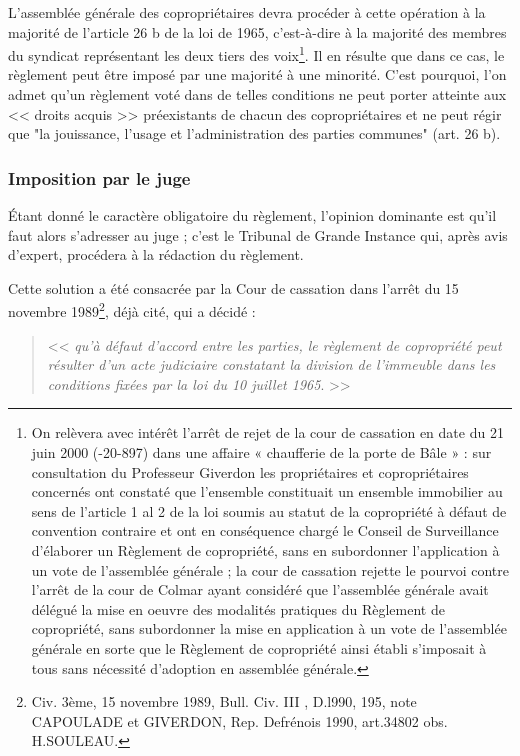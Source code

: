 			L'assemblée générale des copropriétaires devra procéder à cette opération à la majorité de l'article 26 b de la loi de 1965, c'est-à-dire à la majorité des membres du syndicat représentant les deux tiers des voix\footnote{On relèvera avec intérêt l’arrêt de rejet de la cour de cassation en date du 21 juin 2000 (-20-897) dans une affaire « chaufferie de la porte de Bâle » : sur consultation du Professeur Giverdon les propriétaires et copropriétaires concernés ont constaté que l’ensemble constituait un ensemble immobilier au sens de l’article 1 al 2 de la loi soumis au statut de la copropriété à défaut de convention contraire et ont en conséquence chargé le Conseil de Surveillance d’élaborer un Règlement de copropriété, sans en subordonner l’application à un vote de l'assemblée générale ; la cour de cassation rejette le pourvoi contre l’arrêt de la cour de Colmar ayant considéré que l'assemblée générale avait délégué la mise en oeuvre des modalités pratiques du Règlement de copropriété, sans subordonner la mise en application à un vote de l'assemblée générale en sorte que le Règlement de copropriété ainsi établi s’imposait à tous sans nécessité d’adoption en assemblée générale.}. Il en résulte que dans ce cas, le règlement peut être imposé par une majorité à une minorité. C'est pourquoi, l'on admet qu'un règlement voté dans de telles conditions ne peut porter atteinte aux << droits acquis >> préexistants de chacun des copropriétaires et ne peut régir que "la jouissance, l'usage et l'administration des parties communes" (art. 26 b).
		
		\subsubsection{Imposition par le juge}
		
			Étant donné le caractère obligatoire du règlement, l'opinion dominante est qu'il faut alors s'adresser au juge ; c'est le Tribunal de Grande Instance qui, après avis d'expert, procédera à la rédaction du règlement.
			
			Cette solution a été consacrée par la Cour de cassation dans l’arrêt du 15 novembre 1989\footnote{Civ. 3ème, 15 novembre 1989, Bull. Civ. III , D.l990, 195, note CAPOULADE et GIVERDON, Rep. Defrénois 1990, art.34802  obs. H.SOULEAU.}, déjà cité, qui a décidé :
			\begin{quote}
				<< {\itshape qu'à défaut d'accord entre les parties, le règlement de copropriété peut résulter d'un acte judiciaire constatant la division de l'immeuble dans les conditions fixées par la loi du 10 juillet 1965}. >>
			\end{quote}
			

